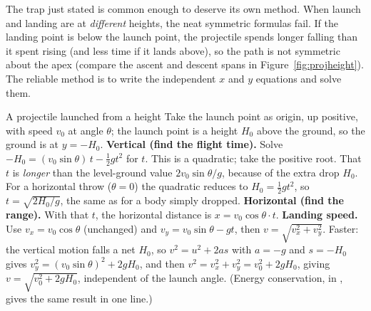 The trap just stated is common enough to deserve its own method. When launch and landing are at
\emph{different} heights, the neat symmetric formulas fail. If the landing
point is below the launch point, the projectile spends longer falling than it spent rising (and less
time if it lands above), so the path is not symmetric about the apex (compare the ascent and descent spans in
Figure~\ref{fig:projheight}). The reliable method is to write
the independent $x$ and $y$ equations and solve them.

\begin{figure}[htbp]
\centering
{}
\end{figure}

\begin{methodbox}{A projectile launched from a height}
Take the launch point as origin, up positive, with speed $v_0$ at angle $\theta$; the launch point
is a height $H_0$ above the ground, so the ground is at $y=-H_0$.
 \textbf{Vertical (find the flight time).} Solve $-H_0=(v_0\sin\theta)\,t-\tfrac12 g t^2$ for
$t$. This is a quadratic; take the positive root. That $t$ is \emph{longer} than the level-ground
value $2v_0\sin\theta/g$, because of the extra drop $H_0$. For a horizontal throw ($\theta=0$) the
quadratic reduces to $H_0=\tfrac12gt^2$, so $t=\sqrt{2H_0/g}$, the same as for a body simply dropped.
 \textbf{Horizontal (find the range).} With that $t$, the horizontal distance is
$x=v_0\cos\theta\cdot t$.
 \textbf{Landing speed.} Use $v_x=v_0\cos\theta$ (unchanged) and $v_y=v_0\sin\theta-gt$, then
$v=\sqrt{v_x^2+v_y^2}$. Faster: the vertical motion falls a net $H_0$, so $v^2=u^2+2as$ with
$a=-g$ and $s=-H_0$ gives $v_y^2=(v_0\sin\theta)^2+2gH_0$, and then $v^2=v_x^2+v_y^2=v_0^2+2gH_0$, giving
$v=\sqrt{v_0^2+2gH_0}$, independent of the launch angle. (Energy conservation, in ,
gives the same result in one line.)
\end{methodbox}


